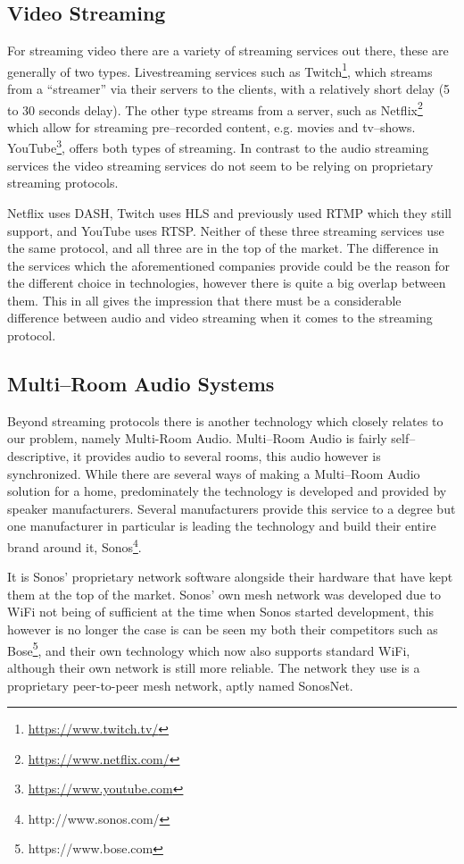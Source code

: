 \subsection{Video Streaming}
For streaming video there are a variety of streaming services out there, these are generally of two types.
Livestreaming services such as Twitch\footnote{\url{https://www.twitch.tv/}}, which streams from a ``streamer'' via their servers to the clients, with a relatively short delay (5 to 30 seconds delay).
The other type streams from a server, such as Netflix\footnote{\url{https://www.netflix.com/}} which allow for streaming pre--recorded content, e.g. movies and tv--shows.
YouTube\footnote{\url{https://www.youtube.com}}, offers both types of streaming.
In contrast to the audio streaming services the video streaming services do not seem to be relying on proprietary streaming protocols.

Netflix uses \ac{DASH}, Twitch uses \ac{HLS} and previously used \ac{RTMP} which they still support, and YouTube uses \ac{RTSP}.\cite{netflix}\cite{twitch}\cite{youtube}
Neither of these three streaming services use the same protocol, and all three are in the top of the market.
The difference in the services which the aforementioned companies provide could be the reason for the different choice in technologies, however there is quite a big overlap between them. 
This in all gives the impression that there must be a considerable difference between audio and video streaming when it comes to the streaming protocol.

\subsection{Multi--Room Audio Systems}
Beyond streaming protocols there is another technology which closely relates to our problem, namely Multi-Room Audio.
Multi--Room Audio is fairly self--descriptive, it provides audio to several rooms, this audio however is synchronized.
While there are several ways of making a Multi--Room Audio solution for a home, predominately the technology is developed and provided by speaker manufacturers.
Several manufacturers provide this service to a degree but one manufacturer in particular is leading the technology and build their entire brand around it, Sonos\footnote{http://www.sonos.com/}.

It is Sonos' proprietary network software alongside their hardware that have kept them at the top of the market.
Sonos' own mesh network was developed due to WiFi not being of sufficient at the time when Sonos started development, this however is no longer the case is can be seen my both their competitors such as Bose\footnote{https://www.bose.com}, and their own technology which now also supports standard WiFi, although their own network is still more reliable.\cite{sonos1} %
The network they use is a proprietary peer-to-peer mesh network, aptly named SonosNet.\cite{sonosWiki} %

